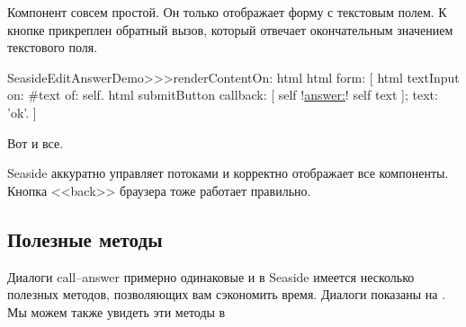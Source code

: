\documentclass[a4paper,10pt,twoside]{book}
\begin{document}

Компонент  совсем простой.
Он только отображает форму с текстовым полем.
К кнопке прикреплен обратный вызов, который отвечает окончательным
значением текстового поля.

\begin{code}{}
SeasideEditAnswerDemo>>>renderContentOn: html
	html form: [
		html textInput
			on: #text of: self.
		html submitButton
			callback: [ self !\underline{answer:}! self text ];
			text: 'ok'.
		]
\end{code}{}


Вот и все.


Seaside аккуратно управляет потоками и корректно отображает все
компоненты. Кнопка <<back>> браузера тоже работает правильно.


\subsection{Полезные методы}


Диалоги call--answer примерно одинаковые и в Seaside имеется несколько
полезных методов, позволяющих вам сэкономить время.
Диалоги показаны на .
Мы можем также увидеть эти методы в
\end{document}
